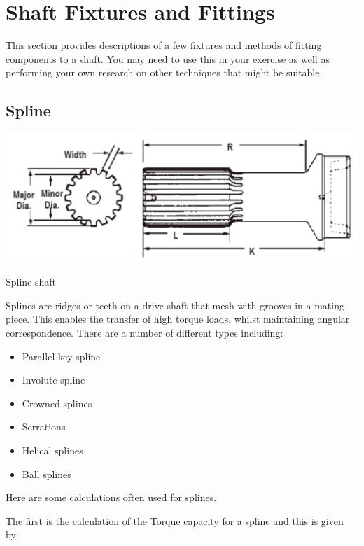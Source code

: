 
\section{Shaft Fixtures and Fittings}

This section provides descriptions of a few fixtures and methods of fitting components to a shaft. You may need to use this in your exercise as well as performing your own research on other techniques that might be suitable.

\subsection{Spline}

\begin{marginfigure}
  \centering
  \includegraphics[width=\textwidth]{figs/spline-shaft.png}
  \caption{Spline shaft}
\end{marginfigure}
Splines are ridges or teeth on a drive shaft that mesh with grooves in a mating piece. This enables the transfer of high torque loads, whilst maintaining angular correspondence. There are a number of different types including:

\begin{itemize}
  \itemsep0em
  \item Parallel key spline
  \item Involute spline
  \item Crowned splines
  \item Serrations
  \item Helical splines
  \item Ball splines
\end{itemize}

Here are some calculations often used for splines.

The first is the calculation of the Torque capacity for a spline and this is given by:

